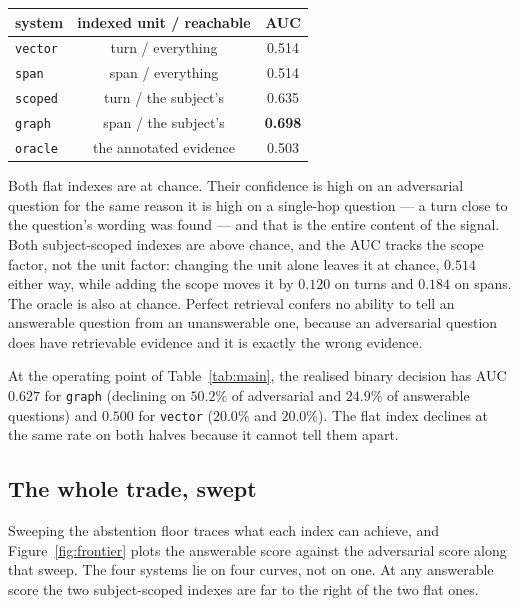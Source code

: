\documentclass[11pt]{article}
\newcommand{\arm}[1]{\texttt{#1}}
\begin{document}
\begin{center}
\small
\begin{tabular}{@{}lcc@{}}
\toprule
system & indexed unit / reachable & AUC \\
\midrule
\arm{vector} & turn / everything          & 0.514 \\
\arm{span}   & span / everything          & 0.514 \\
\arm{scoped} & turn / the subject's       & 0.635 \\
\arm{graph}  & span / the subject's       & \textbf{0.698} \\
\arm{oracle} & the annotated evidence     & 0.503 \\
\bottomrule
\end{tabular}
\end{center}

Both flat indexes are at chance. Their confidence is high on an adversarial
question for the same reason it is high on a single-hop question --- a turn
close to the question's wording was found --- and that is the entire content of
the signal. Both subject-scoped indexes are above chance, and the AUC tracks the
scope factor, not the unit factor: changing the unit alone leaves it at chance,
$0.514$ either way, while adding the scope moves it by $0.120$ on turns and
$0.184$ on spans. The oracle is also at chance. Perfect retrieval confers no ability to tell an answerable
question from an unanswerable one, because an adversarial question does have
retrievable evidence and it is exactly the wrong evidence.

At the operating point of Table~\ref{tab:main}, the realised binary decision has
AUC $0.627$ for \arm{graph} (declining on $50.2\%$ of adversarial and $24.9\%$
of answerable questions) and $0.500$ for \arm{vector} ($20.0\%$ and $20.0\%$).
The flat index declines at the same rate on both halves because it cannot tell
them apart.

\subsection{The whole trade, swept}



Sweeping the abstention floor traces what each index can achieve, and
Figure~\ref{fig:frontier} plots the answerable score against the adversarial
score along that sweep. The four systems lie on four curves, not on one. At any
answerable score the two subject-scoped indexes are far to the right of the two
flat ones.
\end{document}
